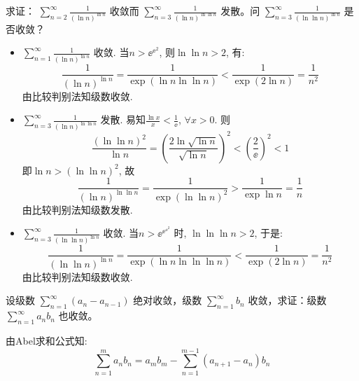\begin{problem}
    求证： \(\sum_{n=2}^{\infty} \frac{1}{(\ln n)^{\ln n}}\) 收敛而
    \(\sum_{n=3}^{\infty} \frac{1}{(\ln n)^{\ln \ln n}}\) 发散。问
    \(\sum_{n=3}^{\infty} \frac{1}{(\ln \ln n)^{\ln n}}\) 是否收敛？
\end{problem}

\begin{solution}
    \begin{itemize}
        \item \(\sum_{n=1}^{\infty} \frac{1}{(\ln n)^{\ln n}}\) 收敛.
            当\(n > \ee^{\ee^{2}}\), 则\(\ln \ln n > 2\), 有:
            \[
                \frac{1}{(\ln n)^{\ln n}} = \frac{1}{\exp(\ln n
                \ln\ln n)} < \frac{1}{\exp(2\ln n)} = \frac{1}{n^2}
            \]
            由比较判别法知级数收敛.
        \item \(\sum_{n=3}^{\infty} \frac{1}{(\ln n)^{\ln \ln n}}\) 发散.
            易知\(\frac{\ln x}{x} < \frac{1}{\ee}\), \(\forall x > 0\).
            则\[
                \frac{(\ln\ln n)^{2}}{\ln n} = \left( \frac{2\ln
                \sqrt{\ln n}}{\sqrt{\ln n}} \right)^{2} < \left(
                \frac{2}{\ee} \right)^{2} < 1
            \]
            即\(\ln n > (\ln \ln n)^{2}\), 故\[
                \frac{1}{(\ln n)^{\ln \ln n}} = \frac{1}{\exp(\ln\ln
                n)^{2}} > \frac{1}{\exp \ln n} = \frac{1}{n}
            \]
            由比较判别法知级数发散.
        \item \(\sum_{n=3}^{\infty} \frac{1}{(\ln \ln n)^{\ln n}}\) 收敛.
            当\(n > \ee^{\ee^{\ee^{2}}}\) 时,
            \(\ln\ln\ln n > 2\), 于是: \[
                \frac{1}{(\ln \ln n)^{\ln n}} = \frac{1}{\exp(\ln n
                \ln\ln\ln n)} < \frac{1}{\exp(2\ln n)} = \frac{1}{n^2}
            \]
            由比较判别法知级数收敛.
    \end{itemize}
\end{solution}
\setcounter{problems}{11}
\begin{problem}
    设级数 \(\sum_{n=1}^{\infty} (a_n - a_{n-1})\) 绝对收敛，级数
    \(\sum_{n=1}^{\infty} b_n\) 收敛，求证：级数 \(\sum_{n=1}^{\infty} a_n b_n\) 也收敛。
\end{problem}

\begin{solution}
    由Abel求和公式知: \[
        \sum_{n=1}^{m} a_{n}b_{n} = a_{m}b_{m} - \sum_{n=1}^{m-1}
        (a_{n+1} - a_{n})b_{n}
    \]

\end{solution}
